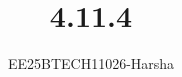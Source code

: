 \documentclass[journal]{IEEEtran}
\begin{document}

\vspace{3cm}

\title{4.11.4}
\author{EE25BTECH11026-Harsha}
 \maketitle
{\let\newpage\relax\maketitle}

\renewcommand{\thefigure}{\theenumi}
\renewcommand{\thetable}{\theenumi}
\setlength{\intextsep}{10pt} %


\renewcommand{\thetable}{\theenumi}
\end{document}
